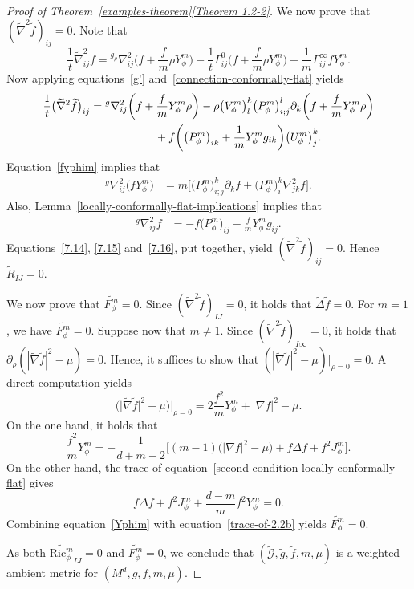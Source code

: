 \documentclass[pdftex]{sigma}
\numberwithin{equation}{section}
\begin{document}
\begin{proof}[Proof of Theorem~\ref{examples-theorem}\ref{Theorem 1.2-2}]
We now prove that $(\widetilde{\nabla}^2\widetilde{f})_{ij}=0$. Note that
\[
\frac{1}{t}\widetilde{\nabla}_{ij}^2 f={}^{g_\rho}\nabla_{ij}^2\biggl(f+\frac{f}{m}\rho Y_\phi^m\biggr)-\frac{1}{t}\Gamma_{ij}^0\biggl(f+\frac{f}{m}\rho Y_\phi^m\biggr)-\frac{1}{m}\Gamma_{ij}^\infty fY_\phi^m.
\]
Now applying equations~\eqref{g'} and~\eqref{connection-conformally-flat} yields
\begin{gather}
\frac{1}{t}\big(\widetilde{\nabla}^2\widetilde{f}\big)_{ij}= {}^g\nabla^2_{ij}\biggl(f+\frac{f}{m}Y_\phi^m\rho\biggr)
-\rho \big(V_\phi^m\big)_l^k\big(P_\phi^m\big)^l_{i;j}\partial_k\biggl(f+\frac{f}{m}Y_\phi^m\rho\biggr)\nonumber
\\ \hphantom{\frac{1}{t}\big(\widetilde{\nabla}^2\widetilde{f}\big)_{ij}=}
{}+f\biggl(\big(P_\phi^m\big)_{ik}+\frac{1}{m}Y_\phi^m g_{ik}\biggr)\big(U_\phi^m\big)_j^k.\label{7.14}
\end{gather}
Equation~\eqref{fyphim} implies that
\begin{align}
\label{7.15}
{}^g\nabla^2_{ij}\big(fY_\phi^m\big)&=m\big[\big(P_\phi^m\big)^k_{i;j}\partial_k f+\big(P_\phi^m\big)_i^k \nabla^2_{jk}f\big].
\end{align}
Also, Lemma~\ref{locally-conformally-flat-implications} implies that
{\samepage\begin{align}
\label{7.16}
{}^g\nabla^2_{ij}f&=-f\big(P_\phi^m\big)_{ij}-\frac{f}{m}Y_\phi^mg_{ij}.
\end{align}
Equations~\eqref{7.14}, \eqref{7.15} and~\eqref{7.16}, put together, yield $(\widetilde{\nabla}^2\widetilde{f})_{ij}=0$. Hence $\widetilde{R}_{IJ}=0$.}

We now prove that $\widetilde{F_\phi^m}=0$. Since $(\widetilde{\nabla}^2\widetilde{f})_{IJ}=0$, it holds that $\widetilde{\Delta}\widetilde{f}=0$. For $m=1$, we have $\widetilde{F_\phi^m}=0$. Suppose now that $m\neq 1$. Since $(\widetilde{\nabla}^2 \widetilde{f})_{I\infty}=0$, it holds that $\partial_\rho(|\widetilde{\nabla}\widetilde{f}|^2-\mu)=0$. Hence, it suffices to show that ${(|\widetilde{\nabla}\widetilde{f}|^2-\mu)}\big|_{\rho=0}=0$. A direct computation yields
\[
\big(\big|\widetilde{\nabla} \widetilde{f}\big|^{2}-\mu\big)\big|_{\rho=0}=2\frac{f^2}{m}Y_\phi^m+|\nabla f|^2-\mu.
\]
On the one hand, it holds that~\cite[Lemma 3.1]{Case2014s}
\begin{equation}
\label{Yphim}
\frac{f^2}{m} Y_{\phi}^{m}=-\frac{1}{d+m-2}\bigl[(m-1)\big(|\nabla f|^2-\mu\big)+f\Delta f+f^2 J_\phi^m\bigr].
\end{equation}
On the other hand, the trace of equation~\eqref{second-condition-locally-conformally-flat} gives
\begin{equation}
\label{trace-of-2.2b}
f\Delta f+f^2 J_\phi^m+ \frac{d-m}{m}f^2 Y_\phi^m=0.
\end{equation}
Combining equation~\eqref{Yphim} with equation~\eqref{trace-of-2.2b} yields $\widetilde{F_\phi^m}=0$.


As both $\widetilde{\mathrm{Ric}_\phi^m}_{IJ}=0$ and $\widetilde{F_\phi^m}=0$, we conclude that $(\widetilde{\mathcal{G}},\widetilde{g},\widetilde{f},m,\mu)$ is a weighted ambient metric for $(M^d,g,f,m,\mu)$.
\end{proof}
\end{document}
